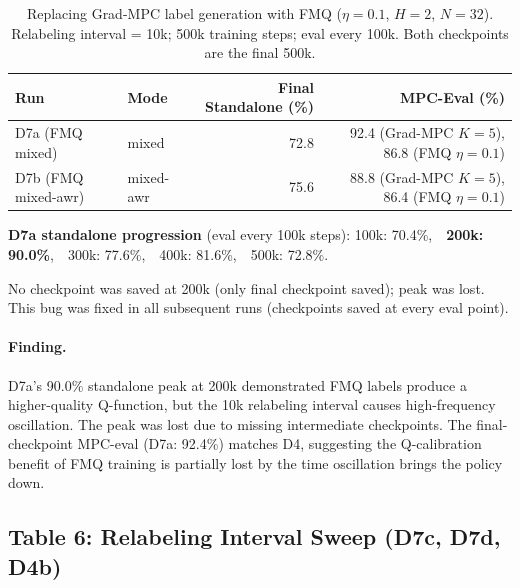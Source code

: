 \documentclass[11pt]{article}
\begin{document}
\begin{table}[h]
\centering
\caption{Replacing Grad-MPC label generation with FMQ ($\eta=0.1$, $H=2$, $N=32$).
  Relabeling interval = 10k; 500k training steps; eval every 100k.
  Both checkpoints are the final 500k.}
\begin{tabular}{llrr}
\toprule
Run & Mode & Final Standalone (\%) & MPC-Eval (\%) \\
\midrule
D7a (FMQ mixed)     & mixed    & 72.8 & 92.4 (Grad-MPC $K=5$), 86.8 (FMQ $\eta=0.1$) \\
D7b (FMQ mixed-awr) & mixed-awr & 75.6 & 88.8 (Grad-MPC $K=5$), 86.4 (FMQ $\eta=0.1$) \\
\bottomrule
\end{tabular}

\medskip
\footnotesize
\noindent\textbf{D7a standalone progression} (eval every 100k steps):
100k: 70.4\%,\ \ \textbf{200k: 90.0\%},\ \ 300k: 77.6\%,\ \ 400k: 81.6\%,\ \ 500k: 72.8\%.

No checkpoint was saved at 200k (only final checkpoint saved); peak was lost.
This bug was fixed in all subsequent runs (checkpoints saved at every eval point).
\normalsize
\end{table}

\paragraph{Finding.}
D7a's 90.0\% standalone peak at 200k demonstrated FMQ labels produce a higher-quality
Q-function, but the 10k relabeling interval causes high-frequency oscillation.
The peak was lost due to missing intermediate checkpoints.
The final-checkpoint MPC-eval (D7a: 92.4\%) matches D4, suggesting the Q-calibration
benefit of FMQ training is partially lost by the time oscillation brings the policy down.

\subsection*{Table 6: Relabeling Interval Sweep (D7c, D7d, D4b)}
\end{document}
